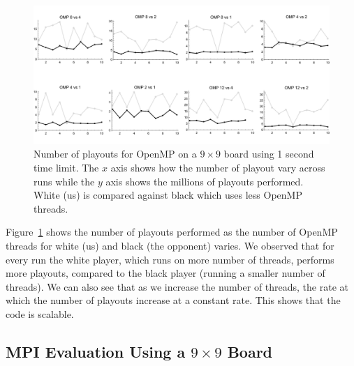 \documentclass[nocopyrightspace, 10pt]{sigplanconf}
\begin{document}
\begin{figure}
\centering
\includegraphics[width=\textwidth]{war_OMP_vs.pdf}
\caption{Number of playouts for OpenMP on a $9\times 9$ board using 1 second time limit. The $x$ axis shows how the number of playout vary across runs while the $y$ axis shows the millions of playouts performed. White (us) is compared against black which uses less OpenMP threads.}
\label{fig:playoutomp}
\end{figure}


Figure~\ref{fig:playoutomp} shows the number of playouts performed as the number of OpenMP threads for white (us) and black (the opponent) varies. We observed that for every run the white player, which runs on more number of threads, performs more playouts, compared to the black player (running a smaller number of threads). We can also see that as we increase the number of threads, the rate at which the number of playouts increase at a constant rate. This shows that the code is scalable. 



\subsection{MPI Evaluation Using a $9 \times 9$ Board}
\end{document}
